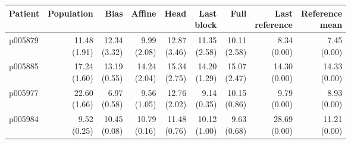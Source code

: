 \documentclass[11pt]{article}
\begin{document}
\begin{table}[!htbp]\centering\scriptsize\setlength{\tabcolsep}{3pt}
\begin{tabular}{lrrrrrrrr}\toprule
Patient & Population & Bias & Affine & Head & \shortstack{Last\\block} & Full & \shortstack{Last\\reference} & \shortstack{Reference\\mean}\\\midrule
p005879 & \shortstack{11.48\\(1.91)} & \shortstack{12.34\\(3.32)} & \shortstack{9.99\\(2.08)} & \shortstack{12.87\\(3.46)} & \shortstack{11.35\\(2.58)} & \shortstack{10.11\\(2.58)} & \shortstack{8.34\\(0.00)} & \shortstack{7.45\\(0.00)}\\
p005885 & \shortstack{17.24\\(1.60)} & \shortstack{13.19\\(0.55)} & \shortstack{14.24\\(2.04)} & \shortstack{15.34\\(2.75)} & \shortstack{14.20\\(1.29)} & \shortstack{15.07\\(2.47)} & \shortstack{14.30\\(0.00)} & \shortstack{14.33\\(0.00)}\\
p005977 & \shortstack{22.60\\(1.66)} & \shortstack{6.97\\(0.58)} & \shortstack{9.56\\(1.05)} & \shortstack{12.76\\(2.02)} & \shortstack{9.14\\(0.35)} & \shortstack{10.15\\(0.86)} & \shortstack{9.79\\(0.00)} & \shortstack{8.93\\(0.00)}\\
p005984 & \shortstack{9.52\\(0.25)} & \shortstack{10.45\\(0.08)} & \shortstack{10.79\\(0.16)} & \shortstack{11.48\\(0.76)} & \shortstack{10.12\\(1.00)} & \shortstack{9.63\\(0.68)} & \shortstack{28.69\\(0.00)} & \shortstack{11.21\\(0.00)}\\

\end{tabular}
\end{table}
\end{document}
